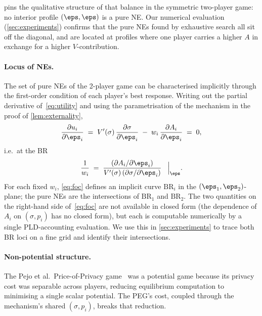  pins the qualitative structure of that
balance in the symmetric two-player game: no interior profile
$(\eps,\eps)$ is a pure NE. Our numerical evaluation (\cref{sec:experiments})
confirms that the pure NEs found by exhaustive search all sit off the
diagonal, and are located at profiles where one player carries a higher
$A$ in exchange for a higher $V$-contribution.

\paragraph{Locus of NEs.}
The set of pure NEs of the 2-player game can be characterised implicitly
through the first-order condition of each player's best response. Writing
out the partial derivative of~\eqref{eq:utility} and using the
parametrisation of the mechanism in the proof of \cref{lem:externality},
\[
\frac{\partial u_i}{\partial \eps_i} \;=\;
V'(\sigma)\, \frac{\partial \sigma}{\partial \eps_i}
\;-\; w_i\, \frac{\partial A_i}{\partial \eps_i}
\;=\; 0,
\]
i.e.\ at the BR
\begin{equation}
\frac{1}{w_i}
\;=\; \frac{ (\partial A_i / \partial \eps_i) }
          { V'(\sigma)\,(\partial \sigma / \partial \eps_i) }
\;\;\;\Big|_{\boldsymbol{\eps}}.
\label{eq:foc}
\end{equation}
For each fixed $w_i$, \cref{eq:foc} defines an implicit curve
$\mathrm{BR}_i$ in the $(\eps_1, \eps_2)$-plane; the pure NEs are the
intersections of $\mathrm{BR}_1$ and $\mathrm{BR}_2$. The two quantities
on the right-hand side of~\eqref{eq:foc} are not available in closed form
(the dependence of $A_i$ on $(\sigma, p_i)$ has no closed form), but each
is computable numerically by a single PLD-accounting evaluation. We use
this in \cref{sec:experiments} to trace both BR loci on a fine grid and
identify their intersections.

\paragraph{Non-potential structure.}
The Pejo et al.\ Price-of-Privacy game~\cite{pejo2019together} was a
potential game because its privacy cost was separable across players,
reducing equilibrium computation to minimising a single scalar potential.
The PEG's cost, coupled through the mechanism's shared $(\sigma, p_i)$,
breaks that reduction.

